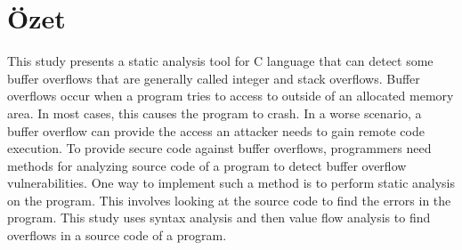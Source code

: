 \chapter*{Özet}

This study presents a static analysis tool for C language that can detect some buffer overflows that are generally called integer and stack overflows. Buffer overflows occur when a program tries to access to outside of an allocated memory area. In most cases, this causes the program to crash. In a worse scenario, a buffer overflow can provide the access an attacker needs to gain remote code execution. To provide secure code against buffer overflows, programmers need methods for analyzing source code of a program to detect buffer overflow vulnerabilities. One way to implement such a method is to perform static analysis on the program. This involves looking at the source code to find the errors in the program. This study uses syntax analysis and then value flow analysis to find overflows in a source code of a program.

\vfill
\clearpage